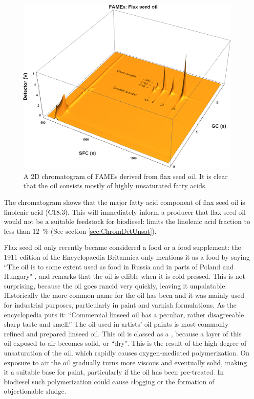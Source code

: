 \begin{figure}
\centering
\includegraphics[width=\textwidth]{Figures/Flax.png}
\decoRule

\caption[SFC×GC of flax seed oil]{A 2D chromatogram of FAMEs derived from
flax seed oil. It is clear that the oil consists mostly of highly unsaturated fatty
acids.}

\label{fig:2DFlax}
\end{figure}

The chromatogram shows that the major fatty acid component of flax seed oil is
linolenic acid (C18:3). This will immediately inform a producer that flax seed
oil would not be a suitable feedstock for biodiesel:  limits the
linolenic acid fraction to less than \SI{12}{\percent} (See section
\ref{sec:ChromDetUnsat}).

Flax seed oil only recently became considered a food or a food supplement: the
1911 edition of the Encyclopaedia Britannica only mentions it as a food by
saying ``The oil is to some extent used as food in Russia and in parts of Poland
and Hungary" \autocite{Linseed1911}, and remarks that the oil is edible when it
is cold pressed. This is not surprising, because the oil goes rancid very
quickly, leaving it unpalatable. Historically the more common name for the oil
has been  and it was mainly used for industrial purposes,
particularly in paint and varnish formulations. As the encyclopedia puts it:
``Commercial linseed oil has a peculiar, rather disagreeable sharp taste and
smell.'' The oil used in artists' oil paints is most commonly refined and
prepared linseed oil. This oil is classed as a , because a
layer of this oil exposed to air becomes solid, or ``dry". This is the result of
the high degree of unsaturation of the oil, which rapidly causes oxygen-mediated
polymerization. On exposure to air the oil gradually turns more viscous and
eventually solid, making it a suitable base for paint, particularly if the oil
has been pre-treated. In biodiesel such polymerization could cause clogging or
the formation of objectionable sludge.

